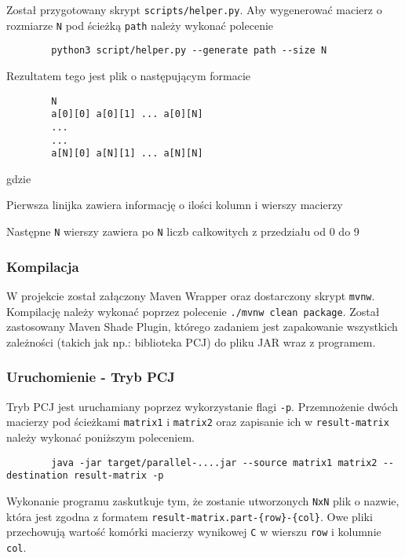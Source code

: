 \documentclass[11pt]{article}
\begin{document}
    Został przygotowany skrypt \verb|scripts/helper.py|. Aby wygenerować macierz o rozmiarze \verb|N| pod ścieżką \verb|path| należy wykonać polecenie
    \begin{lstlisting}
        python3 script/helper.py --generate path --size N
    \end{lstlisting}

    Rezultatem tego jest plik o następującym formacie
    \begin{lstlisting}
        N
        a[0][0] a[0][1] ... a[0][N]
        ...
        ...
        a[N][0] a[N][1] ... a[N][N]
    \end{lstlisting}
    gdzie
    \begin{description}
        \item Pierwsza linijka zawiera informację o ilości kolumn i wierszy macierzy
        \item Następne \verb|N| wierszy zawiera po \verb|N| liczb całkowitych z przedziału od 0 do 9
    \end{description}


    \subsubsection{Kompilacja}
    W projekcie został załączony Maven Wrapper oraz dostarczony skrypt \verb|mvnw|. Kompilację należy wykonać poprzez polecenie \verb|./mvnw clean package|.
    Został zastosowany Maven Shade Plugin, którego zadaniem jest zapakowanie wszystkich zależności (takich jak np.: biblioteka PCJ) do pliku JAR
    wraz z programem.

    \subsubsection{Uruchomienie - Tryb PCJ}
    Tryb PCJ jest uruchamiany poprzez wykorzystanie flagi \verb|-p|. Przemnożenie dwóch macierzy pod ścieżkami \verb|matrix1| i \verb|matrix2| oraz zapisanie ich
    w \verb|result-matrix| należy wykonać poniższym poleceniem.

    \begin{lstlisting}
        java -jar target/parallel-....jar --source matrix1 matrix2 --destination result-matrix -p
    \end{lstlisting}

    Wykonanie programu zaskutkuje tym, że zostanie utworzonych \verb|NxN| plik o nazwie, która jest zgodna z formatem \verb|result-matrix.part-{row}-{col}|.
    Owe pliki przechowują wartość komórki macierzy wynikowej \verb|C| w wierszu \verb|row| i kolumnie \verb|col|.
\end{document}
